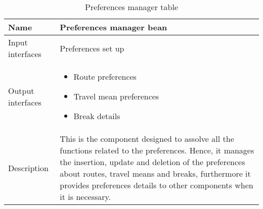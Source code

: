 \begin{flushleft}
	
	\begin{table}[htp]
		
		\begin{tabular}{l|p{7cm}}
		
			Name&\textbf{Preferences manager bean}\\
			\hline
			\hline
			Input interfaces& Preferences set up \\
			\hline
			Output interfaces&
			\begin{itemize}
					 \item Route preferences \item Travel mean preferences \item Break details
			\end{itemize}
			\\
			\hline
			Description&This is the component designed to assolve all the functions related to the preferences. Hence, it manages the insertion, update and deletion of the preferences about routes, travel means and breaks, furthermore it provides preferences details to other components when it is necessary. \\
			\hline
			
		\end{tabular}
		
		\caption{Preferences manager table } 
		\label{tab:preferencesmanagertable}
		
	\end{table}
	
\end{flushleft}

